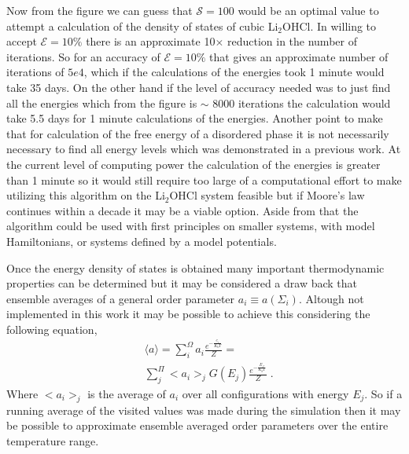 \documentclass[twocolumn]{article}
\begin{document}
 Now from the figure we can guess that $\mathcal{S}=100$ would be an optimal value to attempt a calculation of the density of states of cubic Li$_2$OHCl. In willing to accept $\mathcal{E}=10\%$ there is an approximate 10$\times$ reduction in the number of iterations. So for an accuracy of $\mathcal{E}=10\%$ that gives an approximate number of iterations of $5e4$, which if the calculations of the energies took 1 minute would take  35 days. On the other hand if the level of accuracy needed was to just find all the energies which from the figure is $\sim$ 8000 iterations the calculation would take 5.5 days for 1 minute calculations of the energies. Another point to make that for calculation of the free energy of a disordered phase it is not necessarily necessary to find all energy levels which was demonstrated in a previous work. At the current level of computing power the calculation of the energies is greater than 1 minute so it would still require too large of a computational effort to make utilizing this algorithm on the Li$_2$OHCl system feasible but if Moore's law continues within a decade it may be a viable option. Aside from that the algorithm could be used with first principles on smaller systems, with model Hamiltonians, or systems defined by a model potentials.  

 Once the energy density of states is obtained many important thermodynamic properties can be determined but it may be considered a draw back that ensemble averages of a general order parameter $a_i \equiv a(\Sigma_i)$. Altough not implemented in this work it may be possible to achieve this considering the following equation, 
\begin{equation}
\begin{split}
&\langle a \rangle = \sum_i^{\Omega}a_i \frac{ e^{- \frac{e_i}{K_bT}  }}{Z} = \\
&\sum_j^{\Pi}<a_i>_{j}G(E_j)\frac{e^{-\frac{E_J}{K_bT} }}{Z} \; . 
\end{split} 
\end{equation}
Where $<a_i>_{j}$ is the average of $a_i$ over all configurations with energy $E_j$. So if a running average of the visited values was made during the simulation then it may be possible to approximate ensemble averaged order parameters over the entire temperature range.  


\end{document}
